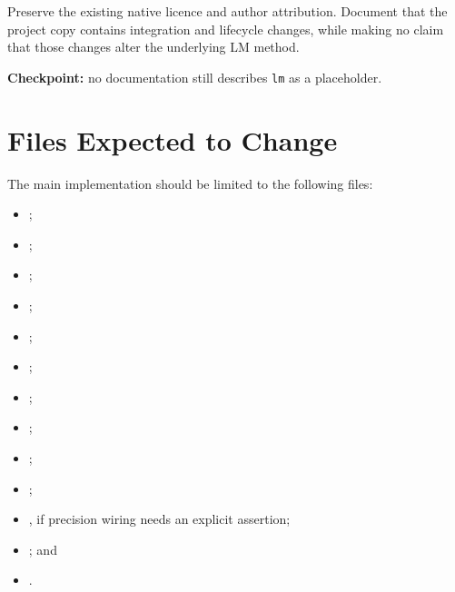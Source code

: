 \documentclass[11pt,a4paper]{article}
\begin{document}
Preserve the existing native licence and author attribution. Document that the
project copy contains integration and lifecycle changes, while making no claim
that those changes alter the underlying LM method.

\textbf{Checkpoint:} no documentation still describes \texttt{lm} as a
placeholder.

\section{Files Expected to Change}

The main implementation should be limited to the following files:

\begin{itemize}

\item {};

\item {};

\item {};

\item {};

\item {};

\item {};

\item {};

\item {};

\item {};

\item {};

\item {}, if precision wiring needs an
explicit assertion;

\item {}; and

\item {}.

\end{itemize}
\end{document}

